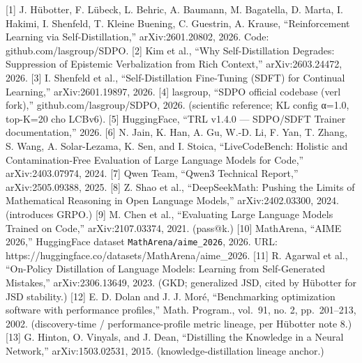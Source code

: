 {[}1{]} J. Hübotter, F. Lübeck, L. Behric, A. Baumann, M. Bagatella, D.
Marta, I. Hakimi, I. Shenfeld, T. Kleine Buening, C. Guestrin, A.
Krause, ``Reinforcement Learning via Self-Distillation,''
arXiv:2601.20802, 2026. Code: github.com/lasgroup/SDPO. {[}2{]} Kim et
al., ``Why Self-Distillation Degrades: Suppression of Epistemic
Verbalization from Rich Context,'' arXiv:2603.24472, 2026. {[}3{]} I.
Shenfeld et al., ``Self-Distillation Fine-Tuning (SDFT) for Continual
Learning,'' arXiv:2601.19897, 2026. {[}4{]} lasgroup, ``SDPO official
codebase (verl fork),'' github.com/lasgroup/SDPO, 2026. (scientific
reference; KL config α=1.0, top-K=20 cho LCBv6). {[}5{]} HuggingFace,
``TRL v1.4.0 --- SDPO/SDFT Trainer documentation,'' 2026. {[}6{]} N.
Jain, K. Han, A. Gu, W.-D. Li, F. Yan, T. Zhang, S. Wang, A.
Solar-Lezama, K. Sen, and I. Stoica, ``LiveCodeBench: Holistic and
Contamination-Free Evaluation of Large Language Models for Code,''
arXiv:2403.07974, 2024. {[}7{]} Qwen Team, ``Qwen3 Technical Report,''
arXiv:2505.09388, 2025. {[}8{]} Z. Shao et al., ``DeepSeekMath: Pushing
the Limits of Mathematical Reasoning in Open Language Models,''
arXiv:2402.03300, 2024. (introduces GRPO.) {[}9{]} M. Chen et al.,
``Evaluating Large Language Models Trained on Code,'' arXiv:2107.03374,
2021. (pass@k.) {[}10{]} MathArena, ``AIME 2026,'' HuggingFace dataset
\texttt{MathArena/aime\_2026}, 2026. URL:
https://huggingface.co/datasets/MathArena/aime\_2026. {[}11{]} R.
Agarwal et al., ``On-Policy Distillation of Language Models: Learning
from Self-Generated Mistakes,'' arXiv:2306.13649, 2023. (GKD;
generalized JSD, cited by Hübotter for JSD stability.) {[}12{]} E. D.
Dolan and J. J. Moré, ``Benchmarking optimization software with
performance profiles,'' Math. Program., vol.~91, no. 2, pp.~201--213,
2002. (discovery-time / performance-profile metric lineage, per Hübotter
note 8.) {[}13{]} G. Hinton, O. Vinyals, and J. Dean, ``Distilling the
Knowledge in a Neural Network,'' arXiv:1503.02531, 2015.
(knowledge-distillation lineage anchor.)
